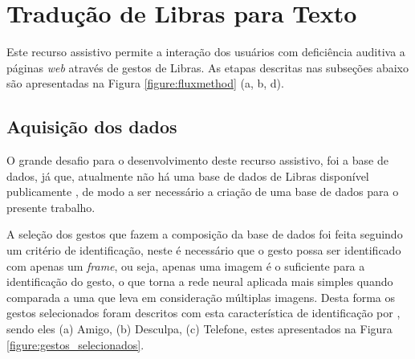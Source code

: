 \section{Tradução de Libras para Texto}

\par Este recurso assistivo permite a interação dos usuários com deficiência auditiva a páginas \textit{web} através de gestos de Libras. As etapas descritas nas subseções abaixo são apresentadas na Figura \ref{figure:fluxmethod} (a, b, d).

\subsection{Aquisição dos dados}

\par O grande desafio para o desenvolvimento deste recurso assistivo, foi a base de dados, já que, atualmente não há uma base de dados de Libras disponível publicamente \cite{Magalh2018}, de modo a ser necessário a criação de uma base de dados para o presente trabalho.

\par A seleção dos gestos que fazem a composição da base de dados foi feita seguindo um critério de identificação, neste é necessário que o gesto possa ser identificado com apenas um \textit{frame}, ou seja, apenas uma imagem é o suficiente para a identificação do gesto, o que torna a rede neural aplicada mais simples quando comparada a uma que leva em consideração múltiplas imagens. Desta forma os gestos selecionados foram descritos com esta característica de identificação por , sendo eles (a) Amigo, (b) Desculpa, (c) Telefone, estes apresentados na Figura \ref{figure:gestos_selecionados}.

